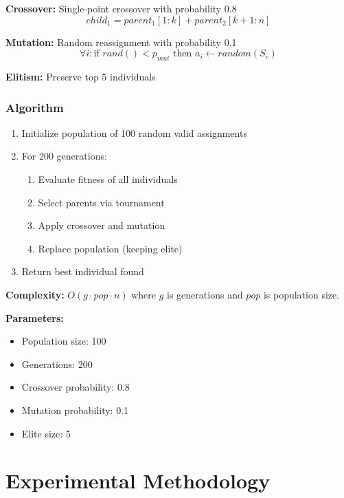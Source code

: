 \documentclass[algorithms,article,submit,pdftex,moreauthors]{Definitions/mdpi}
\begin{document}
\textbf{Crossover:} Single-point crossover with probability 0.8
\begin{equation}
child_1 = parent_1[1:k] + parent_2[k+1:n]
\end{equation}

\textbf{Mutation:} Random reassignment with probability 0.1
\begin{equation}
\forall i: \text{if } rand() < p_{mut} \text{ then } a_i \leftarrow random(S_c)
\end{equation}

\textbf{Elitism:} Preserve top 5 individuals

\subsubsection{Algorithm}

\begin{enumerate}
\item Initialize population of 100 random valid assignments
\item For 200 generations:
   \begin{enumerate}
   \item Evaluate fitness of all individuals
   \item Select parents via tournament
   \item Apply crossover and mutation
   \item Replace population (keeping elite)
   \end{enumerate}
\item Return best individual found
\end{enumerate}

\textbf{Complexity:} $O(g \cdot pop \cdot n)$ where $g$ is generations and $pop$ is population size.

\textbf{Parameters:}
\begin{itemize}
\item Population size: 100
\item Generations: 200
\item Crossover probability: 0.8
\item Mutation probability: 0.1
\item Elite size: 5
\end{itemize}

\section{Experimental Methodology}
\end{document}

